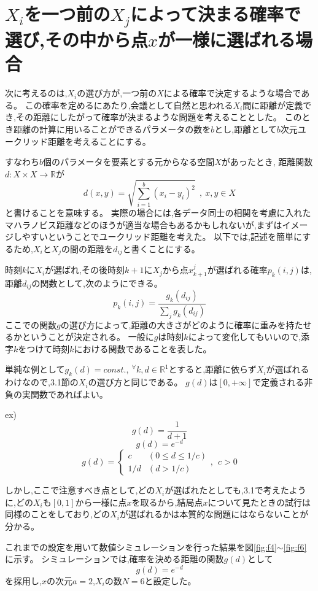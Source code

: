 \section{$X_{i}$を一つ前の$X_{j}$によって決まる確率で選び,その中から点$x$が一様に選ばれる場合}

次に考えるのは,$X_{i}$の選び方が,一つ前の$X$による確率で決定するような場合である。
この確率を定めるにあたり,会議として自然と思われる$X_{i}$間に距離が定義でき,その距離にしたがって確率が決まるような問題を考えることとした。
このとき距離の計算に用いることができるパラメータの数を$b$とし,距離として$b$次元ユークリッド距離を考えることにする。

すなわち$b$個のパラメータを要素とする元からなる空間$X$があったとき,
距離関数$d: X \times X \rightarrow \mathbb{R}$が
\[d(x, y) = \sqrt{\sum_{i=1}^{b}(x_{i}-y_{i})^{2}}\ \ ,\ x,y\in X\]
と書けることを意味する。
実際の場合には,各データ同士の相関を考慮に入れたマハラノビス距離などのほうが適当な場合もあるかもしれないが,まずはイメージしやすいということでユークリッド距離を考えた。
以下では,記述を簡単にするため,$X_{i}$と$X_{j}$の間の距離を$d_{ij}$と書くことにする。

時刻$k$に$X_{i}$が選ばれ,その後時刻$k+1$に$X_{j}$から点$x_{k+1}^{j}$が選ばれる確率$p_{k}(i,j)$は,距離$d_{ij}$の関数として,次のようにできる。
\[p_{k}(i,j) = \frac{g_{k}(d_{ij})}{\sum_{j} g_{k}(d_{ij})}\]
ここでの関数$g$の選び方によって,距離の大きさがどのように確率に重みを持たせるかということが決定される。
一般に$g$は時刻$k$によって変化してもいいので,添字$k$をつけて時刻$k$における関数であることを表した。

単純な例として$g_{k}(d) = const.,\ ^{\forall}k, d\in \mathbb{R}^{1}$とすると,距離に依らず$X_{i}$が選ばれるわけなので,3.1節の$X_{i}$の選び方と同じである。
$g(d)$は$[0, +\infty]$で定義される非負の実関数であればよい。

ex)
\[g(d) = \frac{1}{d+1}\]
\[g(d) = e^{-d}\]
\[g(d) = \left\{ \begin{array}{ll} c & (0\le d \le 1/c) \nonumber\\
1/d & (d>1/c)\end{array}\right., \ \ c>0\]

しかし,ここで注意すべき点として,どの$X_{i}$が選ばれたとしても,3.1で考えたように,どの$X_{i}$も$[0,1]$から一様に点$x$を取るから,結局点$x$について見たときの試行は同様のことをしており,どの$X_{i}$が選ばれるかは本質的な問題にはならないことが分かる。

これまでの設定を用いて数値シミュレーションを行った結果を図\ref{fig:f4}$\sim$\ref{fig:f6}に示す。
シミュレーションでは,確率を決める距離の関数$g(d)$として
\[g(d) = e^{-d}\]
を採用し,$x$の次元$a=2$,$X_{i}$の数$N=6$と設定した。

